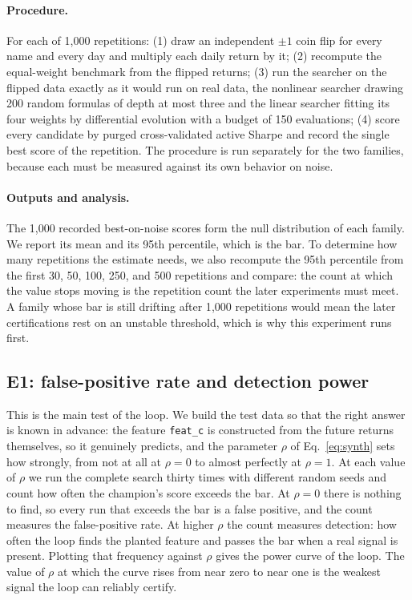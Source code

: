 \documentclass[11pt]{article}
\newcommand{\code}[1]{\texttt{#1}}
\begin{document}
\paragraph{Procedure.} For each of 1{,}000 repetitions: (1) draw an independent $\pm 1$ coin flip for
every name and every day and multiply each daily return by it; (2) recompute the equal-weight benchmark
from the flipped returns; (3) run the searcher on the flipped data exactly as it would run on real data,
the nonlinear searcher drawing 200 random formulas of depth at most three and the linear searcher fitting
its four weights by differential evolution with a budget of 150 evaluations; (4) score every candidate by
purged cross-validated active Sharpe and record the single best score of the repetition. The procedure is
run separately for the two families, because each must be measured against its own behavior on noise.

\paragraph{Outputs and analysis.} The 1{,}000 recorded best-on-noise scores form the null distribution of
each family. We report its mean and its 95th percentile, which is the bar. To determine how many
repetitions the estimate needs, we also recompute the 95th percentile from the first 30, 50, 100, 250,
and 500 repetitions and compare: the count at which the value stops moving is the repetition count the
later experiments must meet. A family whose bar is still drifting after 1{,}000 repetitions would mean
the later certifications rest on an unstable threshold, which is why this experiment runs first.

\subsection{E1: false-positive rate and detection power}

This is the main test of the loop. We build
the test data so that the right answer is known in advance: the feature \code{feat\_c} is constructed
from the future returns themselves, so it genuinely predicts, and the parameter $\rho$ of
Eq.~\eqref{eq:synth} sets how strongly, from not at all at $\rho=0$ to almost perfectly at $\rho=1$. At
each value of $\rho$ we run the complete search thirty times with different random seeds and count how
often the champion's score exceeds the bar. At $\rho=0$ there is nothing to find, so every run that
exceeds the bar is a false positive, and the count measures the false-positive rate. At higher $\rho$ the
count measures detection: how often the loop finds the planted feature and passes the bar when a real
signal is present. Plotting that frequency against $\rho$ gives the power curve of the loop. The value of
$\rho$ at which the curve rises from near zero to near one is the weakest signal the loop can reliably
certify.
\end{document}

